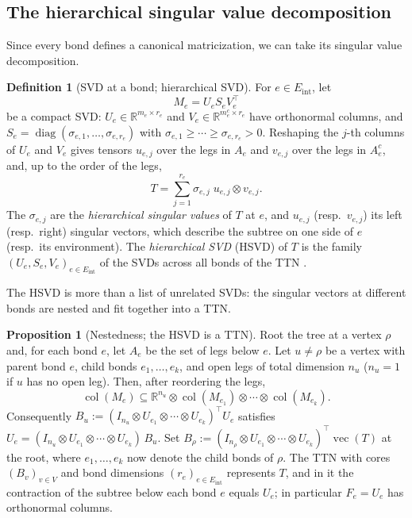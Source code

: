\documentclass[11pt]{article}
\newcommand{\diag}{\operatorname{diag}}
\newcommand{\R}{\mathbb{R}}
\newcommand{\col}{\operatorname{col}}
\newcommand{\vect}{\operatorname{vec}}
\newcommand{\Eint}{E_{\mathrm{int}}}
\theoremstyle{definition}
\newtheorem{proposition}[theorem]{Proposition}
\newtheorem{definition}[theorem]{Definition}
\numberwithin{equation}{section}
\begin{document}
\subsection{The hierarchical singular value decomposition}\label{sec:hsvd}

Since every bond defines a canonical matricization, we can take its singular value decomposition.

\begin{definition}[SVD at a bond; hierarchical SVD]\label{def:hsvd}
For $e\in\Eint$, let
\[
M_e=U_eS_eV_e^\top
\]
be a compact SVD: $U_e\in\R^{m_e\times r_e}$ and $V_e\in\R^{m_e^c\times r_e}$ have orthonormal columns, and $S_e=\diag(\sigma_{e,1},\dots,\sigma_{e,r_e})$ with $\sigma_{e,1}\ge\cdots\ge\sigma_{e,r_e}>0$. Reshaping the $j$-th columns of $U_e$ and $V_e$ gives tensors $u_{e,j}$ over the legs in $A_e$ and $v_{e,j}$ over the legs in $A_e^c$, and, up to the order of the legs,
\begin{equation}\label{eq:schmidt-tensor}
T=\sum_{j=1}^{r_e}\sigma_{e,j}\;u_{e,j}\otimes v_{e,j}.
\end{equation}
The $\sigma_{e,j}$ are the \emph{hierarchical singular values} of $T$ at $e$, and $u_{e,j}$ (resp.\ $v_{e,j}$) its left (resp.\ right) singular vectors, which describe the subtree on one side of $e$ (resp.\ its environment). The \emph{hierarchical SVD} (HSVD) of $T$ is the family $(U_e,S_e,V_e)_{e\in\Eint}$ of the SVDs across all bonds of the TTN \citep{grasedyck2010hierarchical}.
\end{definition}

The HSVD is more than a list of unrelated SVDs: the singular vectors at different bonds are nested and fit together into a TTN.

\begin{proposition}[Nestedness; the HSVD is a TTN]\label{prop:nested}
Root the tree at a vertex $\rho$ and, for each bond $e$, let $A_e$ be the set of legs below $e$. Let $u\neq\rho$ be a vertex with parent bond $e$, child bonds $e_1,\dots,e_k$, and open legs of total dimension $n_u$ ($n_u=1$ if $u$ has no open leg). Then, after reordering the legs,
\begin{equation}\label{eq:nested}
\col(M_e)\subseteq\R^{n_u}\otimes\col(M_{e_1})\otimes\cdots\otimes\col(M_{e_k}).
\end{equation}
Consequently $B_u:=(I_{n_u}\otimes U_{e_1}\otimes\cdots\otimes U_{e_k})^\top U_e$ satisfies $U_e=(I_{n_u}\otimes U_{e_1}\otimes\cdots\otimes U_{e_k})\,B_u$. Set $B_\rho:=(I_{n_\rho}\otimes U_{e_1}\otimes\cdots\otimes U_{e_k})^\top\vect(T)$ at the root, where $e_1,\dots,e_k$ now denote the child bonds of $\rho$. The TTN with cores $(B_v)_{v\in V}$ and bond dimensions $(r_e)_{e\in\Eint}$ represents $T$, and in it the contraction of the subtree below each bond $e$ equals $U_e$; in particular $F_e=U_e$ has orthonormal columns.
\end{proposition}
\end{document}
